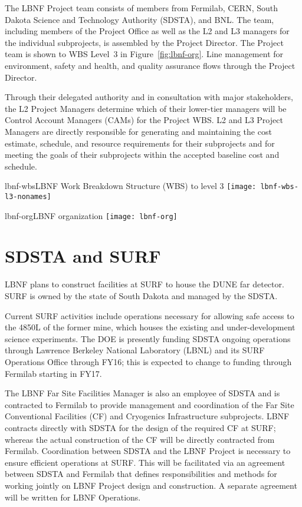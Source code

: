 
The LBNF Project team consists of members from Fermilab, CERN, South Dakota Science and Technology Authority (SDSTA), and BNL.  The team, including members of the Project Office as well as the L2 and L3 managers for the individual subprojects, is assembled by the Project Director. The Project team is shown to WBS Level~3 in Figure~\ref{fig:lbnf-org}. 
Line management for environment, safety and health, and quality assurance flows through the Project Director. 

Through their delegated authority and in consultation with major stakeholders, the L2 Project Managers determine which of their lower-tier managers will be Control Account Managers (CAMs) for the Project WBS. L2 and L3 Project Managers are directly responsible for generating and maintaining the cost estimate, schedule, and resource requirements for their subprojects and for meeting the goals of their subprojects within the accepted baseline cost and schedule. 

\begin{cdrfigure}{lbnf-wbs}{LBNF Work Breakdown Structure (WBS) to level 3}
\texttt{[image: lbnf-wbs-l3-nonames]}
\end{cdrfigure}



\begin{cdrfigure}{lbnf-org}{LBNF organization}
\texttt{[image: lbnf-org]}
\end{cdrfigure}

\section{SDSTA and SURF}

LBNF plans to construct facilities at SURF to house the DUNE far detector. SURF is owned by the state of South Dakota and managed by the SDSTA. 

Current SURF activities include operations necessary for allowing safe access to the 4850L of the former mine, which houses the existing and under-development science experiments. The DOE is presently funding SDSTA ongoing operations through Lawrence Berkeley National Laboratory (LBNL) and its SURF Operations Office through FY16; this is expected to change to funding through Fermilab starting in FY17. 

The LBNF Far Site Facilities Manager is also an employee of SDSTA and is contracted to Fermilab to provide management and coordination of the Far Site Conventional Facilities (CF) and Cryogenics Infrastructure subprojects. LBNF contracts directly with SDSTA for the design of the required CF at SURF; whereas the actual construction of the CF will be directly contracted from Fermilab. Coordination between SDSTA and the LBNF Project is necessary to ensure efficient operations at SURF. This will be facilitated via an agreement between SDSTA and Fermilab  that defines responsibilities and methods for working jointly on LBNF Project design and construction. A separate agreement will be written for LBNF Operations. 

